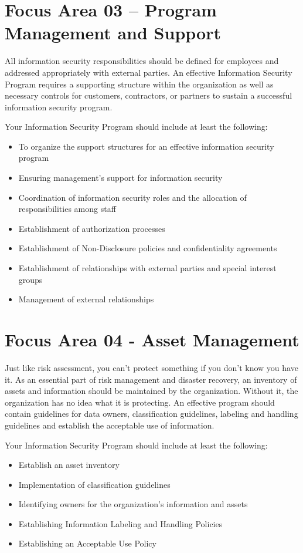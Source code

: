 \documentclass{needs}
\begin{document}
		
		\fTwoTable
				
	\section{Focus Area 03 -- Program Management and Support}
	
		All information security responsibilities should be defined for employees and addressed appropriately with external parties.  An effective Information Security Program requires a supporting structure within the organization as well as necessary controls for customers, contractors, or partners to sustain a successful information security program.
		
		Your Information Security Program should include at least the following: 
		\begin{itemize}
			\item To organize the support structures for an effective information security program
			\item Ensuring management’s support for information security
			\item Coordination of information security roles and the allocation of responsibilities among staff
			\item Establishment of authorization processes
			\item Establishment of Non-Disclosure policies and confidentiality agreements
			\item Establishment of relationships with external parties and special interest groups
			\item Management of external relationships
		\end{itemize}		
	
		
		\fThreeTable
		
	\section{Focus Area 04 - Asset Management}
	
		Just like risk assessment, you can’t protect something if you don’t know you have it. As an essential part of risk management and disaster recovery, an inventory of assets and information should be maintained by the organization.  Without it, the organization has no idea what it is protecting. An effective program should contain guidelines for data owners, classification guidelines, labeling and handling guidelines and establish the acceptable use of information.
		
		Your Information Security Program should include at least the following: 
		\begin{itemize}
			\item Establish an asset inventory
			\item Implementation of classification guidelines
			\item Identifying owners for the organization’s information and assets
			\item Establishing Information Labeling and Handling Policies
			\item Establishing an Acceptable Use Policy
		\end{itemize}	
		
\end{document}
